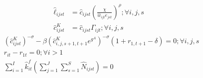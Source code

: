 \documentclass[letterpaper,12pt]{article}
\theoremstyle{definition}
\numberwithin{equation}{section}
\begin{document}
\begin{spacing}{1.5}
\begin{align}
		\hat \ell_{ijst} & = \hat c_{ijst} \left(\frac{\chi}{\hat w_{ijt}e_{jst}}\right)^\rho ; \forall i,j,s \\
		\hat c^K_{ijst} & = \hat c_{ijst} \Gamma_{ijt}; \forall i,j,s
	\end{align}
	\begin{align}
		& \left({\hat c^K_{ijst}}\right)^{-\sigma} - \beta \left(\hat c^K_{i,j,s+1,t+1} e^{g^A}\right)^{-\sigma}(1+r_{1,t+1}-\delta) = 0; \forall i,j,s \\
		& r_{it} - r_{1t} = 0; \forall i>1 \\
		& \sum_{i=1}^I \hat k^f_{it} \left( \sum_{j=1}^J \sum_{s=1}^S \hat N_{ijst} \right) = 0
	\end{align}

\end{spacing}
\end{document}
